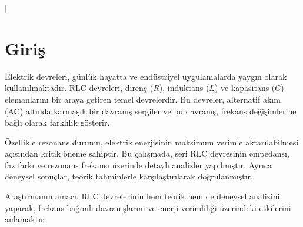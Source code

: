 \documentclass[11pt,letterpaper,twocolumn]{fenbil}
\begin{document}
]
\section{Giriş}
\justify
Elektrik devreleri, günlük hayatta ve endüstriyel uygulamalarda yaygın olarak kullanılmaktadır. RLC devreleri, direnç (\(R\)), indüktans (\(L\)) ve kapasitans (\(C\)) elemanlarını bir araya getiren temel devrelerdir. Bu devreler, alternatif akım (AC) altında karmaşık bir davranış sergiler ve bu davranış, frekans değişimlerine bağlı olarak farklılık gösterir. 

Özellikle rezonans durumu, elektrik enerjisinin maksimum verimle aktarılabilmesi açısından kritik öneme sahiptir. Bu çalışmada, seri RLC devresinin empedansı, faz farkı ve rezonans frekansı üzerinde detaylı analizler yapılmıştır. Ayrıca deneysel sonuçlar, teorik tahminlerle karşılaştırılarak doğrulanmıştır.

Araştırmanın amacı, RLC devrelerinin hem teorik hem de deneysel analizini yaparak, frekans bağımlı davranışlarını ve enerji verimliliği üzerindeki etkilerini anlamaktır.
\end{document}
